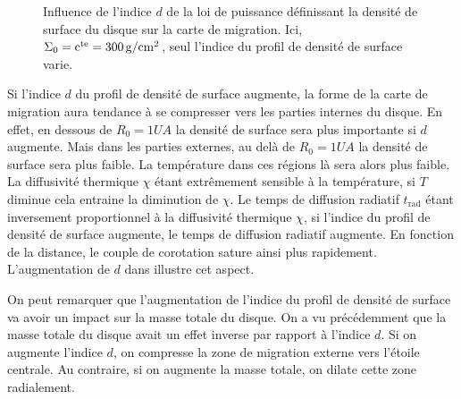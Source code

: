 \begin{figure}[htb]
\centering
{}\hfill
{}

\caption{Influence de l'indice $d$ de la loi de puissance définissant la densité de surface du disque sur la carte de migration. Ici, $\Sigma_0=\mathrm{c^{te}}=300\mathrm{\thinspace g/cm^2}$, seul l'indice du profil de densité de surface varie. }\label{fig:map_index}
\end{figure}

Si l'indice $d$ du profil de densité de surface augmente, la forme de la carte de migration aura tendance à se compresser vers les parties internes du disque. En effet, en dessous de $R_0=1\unit{UA}$ la densité de surface sera plus importante si $d$ augmente. Mais dans les parties externes, au delà de $R_0=1\unit{UA}$ la densité de surface sera plus faible. La température dans ces régions là sera alors plus faible. La diffusivité thermique $\chi$ étant extrêmement sensible à la température, si $T$ diminue cela entraine la diminution de $\chi$. Le temps de diffusion radiatif $t_\text{rad}$ étant inversement proportionnel à la diffusivité thermique $\chi$, si l'indice du profil de densité de surface augmente, le temps de diffusion radiatif augmente. En fonction de la distance, le couple de corotation sature ainsi plus rapidement. L'augmentation de $d$ dans  illustre cet aspect. 

On peut remarquer que l'augmentation de l'indice du profil de densité de surface va avoir un impact sur la masse totale du disque. On a vu précédemment que la masse totale du disque avait un effet inverse par rapport à l'indice $d$. Si on augmente l'indice $d$, on compresse la zone de migration externe vers l'étoile centrale. Au contraire, si on augmente la masse totale, on dilate cette zone radialement. 

